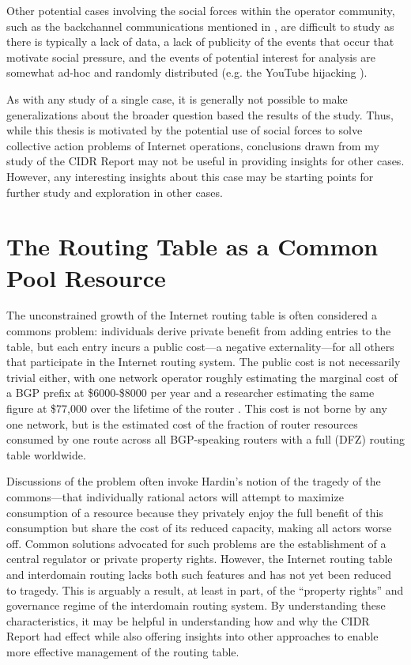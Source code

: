 Other potential cases involving the social forces within the operator
community, such as the backchannel communications mentioned in
\cite{Mathew:2010ly}, are difficult to study as there is typically a lack of
data, a lack of publicity of the events that occur that motivate social
pressure, and the events of potential interest for analysis are somewhat ad-hoc
and randomly distributed (e.g. the YouTube hijacking \cite{Brown:2008hc}).


As with any study of a single case, it is generally not possible to make
generalizations about the broader question based the results of the study.
Thus, while this thesis is motivated by the potential use of social forces to
solve collective action problems of Internet operations, conclusions drawn from
my study of the CIDR Report may not be useful in providing insights for other
cases. However, any interesting insights about this case may be starting points
for further study and exploration in other cases.

\section{The Routing Table as a Common Pool Resource}

The unconstrained growth of the Internet routing table is often considered a
commons problem: individuals derive private benefit from adding entries to the
table, but each entry incurs a public cost---a negative externality---for all
others that participate in the Internet routing system. The public cost is not
necessarily trivial either, with one network operator roughly estimating the
marginal cost of a BGP prefix at \$6000-\$8000 per year \cite{Herrin:2008qa}
and a researcher estimating the same figure at \$77,000 over the lifetime of
the router \cite{Clayton:2010bh}. This cost is not borne by any one network,
but is the estimated cost of the fraction of router resources consumed by one
route across all BGP-speaking routers with a full (DFZ) routing table
worldwide.

Discussions of the problem \cite{Huston:2001bs,Clayton:2010bh,Bellovin:2001qf}
often invoke Hardin's \cite{Hardin:1968uq} notion of the tragedy of the
commons---that individually rational actors will attempt to maximize
consumption of a resource because they privately enjoy the full benefit of this
consumption but share the cost of its reduced capacity, making all actors worse
off. Common solutions advocated for such problems are the establishment of a
central regulator or private property rights. However, the Internet routing
table and interdomain routing lacks both such features and has not yet been
reduced to tragedy. This is arguably a result, at least in part, of the
``property rights'' and governance regime of the interdomain routing system. By
understanding these characteristics, it may be helpful in understanding how and
why the CIDR Report had effect while also offering insights into other
approaches to enable more effective management of the routing table.

